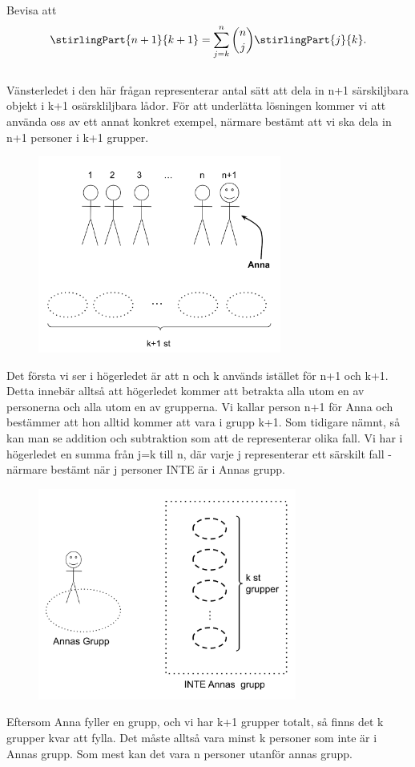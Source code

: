 \documentclass[nobib]{tufte-handout}
\begin{document}
\begin{xca2}
  Bevisa att
  $$\stirlingPart{n+1}{k+1} = \sum_{j=k}^{n} \binom{n}{j}\stirlingPart{j}{k}.$$
\\ \bigskip
Vänsterledet i den här frågan representerar antal sätt att dela in n+1 särskiljbara objekt i k+1 osärskliljbara lådor. För att underlätta lösningen kommer vi att använda oss av ett annat konkret exempel, närmare bestämt att vi ska dela in n+1 personer i k+1 grupper.\\
\begin{figure}[h]
\includegraphics[width=80mm]{ovning_5.1.png}
\end{figure}
\newpage
Det första vi ser i högerledet är att n och k används istället för n+1 och k+1. Detta innebär alltså att högerledet kommer att betrakta alla utom en av personerna och alla utom en av grupperna. Vi kallar person n+1 för Anna och bestämmer att hon alltid kommer att vara i grupp k+1. Som tidigare nämnt, så kan man se addition och subtraktion som att de representerar olika fall. Vi har i högerledet en summa från j=k till n, där varje j representerar ett särskilt fall - närmare bestämt när j personer INTE är i Annas grupp.\\
\begin{figure}[h]
\includegraphics[width=85mm]{ovning_5.2.png}
\end{figure}
Eftersom Anna fyller en grupp, och vi har k+1 grupper totalt, så finns det k grupper kvar att fylla. Det måste alltså vara minst k personer som inte är i Annas grupp. Som mest kan det vara n personer utanför annas grupp.\\


\end{xca2}
\end{document}
